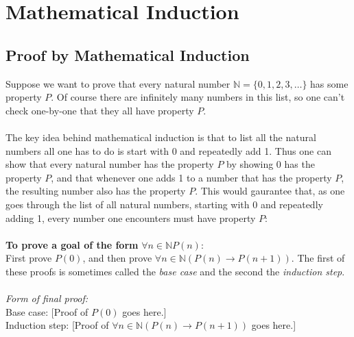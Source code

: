 \documentclass{report}
\theoremstyle{definition}
\begin{document}
\chapter{Mathematical Induction}
\section{Proof by Mathematical Induction}
Suppose we want to prove that every natural number $\mathbb N=\{0,1,2,3,\ldots\}$ has some property $P$.
Of course there are infinitely many numbers in this list, so one can't check one-by-one that they all have property $P$.\\
\vspace{1mm}\\
The key idea behind mathematical induction is that to list all the natural numbers all one has to do is start with 0 and repeatedly add 1. 
Thus one can show that every natural number has the property $P$ by showing 0 has the property $P$, and that whenever one adds 1 to a number that has the property $P$, the resulting number also has
the property $P$. This would gaurantee that, as one goes through the list of all natural numbers, starting with 0 and repeatedly adding 1, every number one encounters must have property $P$:\\
\vspace{1mm}\\
\indent\textbf{To prove a goal of the form }$\forall n\in\mathbb NP(n)$:\\
\indent First prove $P(0)$, and then prove $\forall n\in\mathbb N(P(n)\to P(n+1))$. The first of these proofs is sometimes called the \textit{base case} and the second the 
\textit{induction step}.\\
\vspace{1mm}\\
\textit{Form of final proof:}\\
\indent Base case: [Proof of $P(0)$ goes here.]\\
\indent Induction step: [Proof of $\forall n\in\mathbb N(P(n)\to P(n+1))$ goes here.]
\newpage
\end{document}
